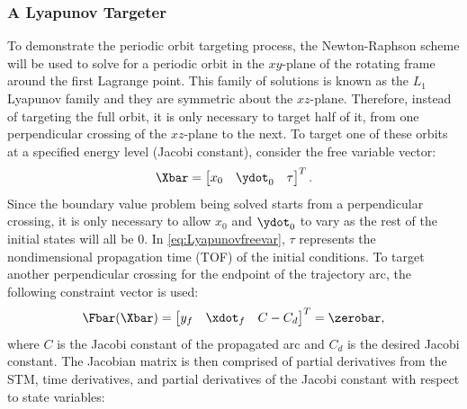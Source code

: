\subsubsection{A Lyapunov Targeter}
To demonstrate the periodic orbit targeting process, the Newton-Raphson scheme will be used to
solve for a periodic orbit in the $xy$-plane of the rotating frame around the first Lagrange point.
This family of solutions is known as the $L_{1}$ Lyapunov family and they are symmetric about the
$xz$-plane. Therefore, instead of targeting the full orbit, it is only necessary to target half of
it, from one perpendicular crossing of the $xz$-plane to the next. To target one of these orbits at
a specified energy level (Jacobi constant), consider the free variable vector:
\begin{equation}
    \Xbar=\begin{bmatrix}   x_{0}   &   \ydot_{0}   &   \tau    \end{bmatrix}^{T}.
    \label{eq:Lyapunovfreevar}
\end{equation}
Since the boundary value problem being solved starts from a perpendicular crossing, it is only
necessary to allow $x_{0}$ and $\ydot_{0}$ to vary as the rest of the initial states will all be
$0$. In \cref{eq:Lyapunovfreevar}, $\tau$ represents the nondimensional propagation time (TOF) of
the initial conditions. To target another perpendicular crossing for the endpoint of the trajectory
arc, the following constraint vector is used:
\begin{equation}
    \Fbar(\Xbar)=\begin{bmatrix}    y_{f}   &   \xdot_{f}   &   C-C_{d} \end{bmatrix}^{T}=\zerobar,
    \label{eq:Lyapunovconst}
\end{equation}
where $C$ is the Jacobi constant of the propagated arc and $C_{d}$ is the desired Jacobi constant.
The Jacobian matrix is then comprised of partial derivatives from the STM, time derivatives, and
partial derivatives of the Jacobi constant with respect to state variables:
